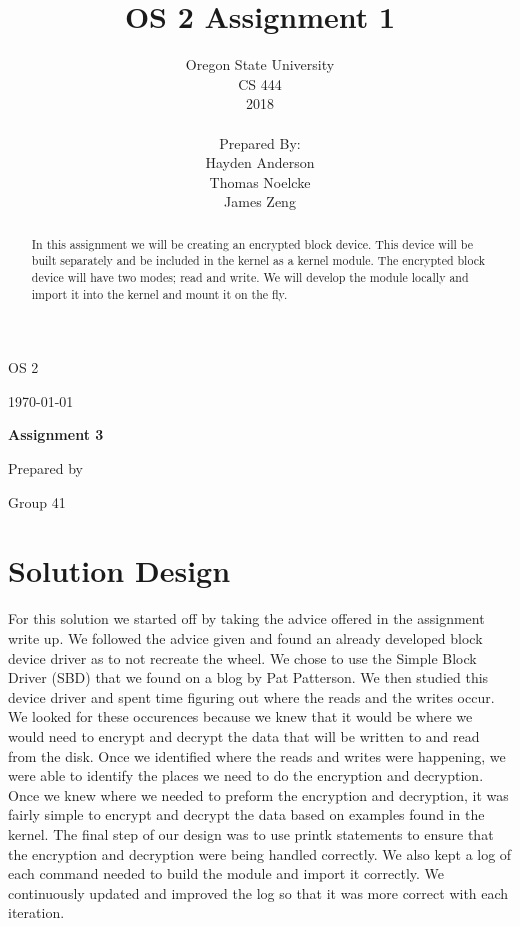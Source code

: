 \documentclass[draftclsnofoot, onecolumn, compsoc, 10pt]{IEEEtran}
\title{OS 2 Assignment 1}
\author{Oregon State University\\CS 444\\2018\\\\Prepared By:\\Hayden
Anderson\\Thomas Noelcke\\James Zeng\\}
\def \CapstoneTeamNumber{		41	}
\def \CapstoneProjectName{		Assignment 3 }
\begin{document}
\begin{titlepage}
    \begin{singlespace}
        \hfill
        \par\vspace{.2in}
        \centering
        \scshape{
            \huge OS 2 \par
            {\large\today}\par
            \vspace{1in}
            \textbf{\Huge\CapstoneProjectName}\par
            \vspace{1in}
            {\large Prepared by }\par
            Group\CapstoneTeamNumber\par
            \vspace{5pt}
            \vspace{20pt}
        }
        \vfill
    \end{singlespace}
    \begin{abstract}
        In this assignment we will be creating an encrypted block device. This device will be built separately and be included in the kernel as a kernel module. The encrypted block device will have two modes; read and write. We will develop the module locally and import it into the kernel and mount it on the fly.\\
    \end{abstract}
\end{titlepage}
\newpage
{}
\clearpage
\tableofcontents
\pagebreak

\section{Solution Design}
    For this solution we started off by taking the advice offered in the assignment write up. We followed the advice given and found an already developed block device driver as to not recreate the wheel. We chose to use the Simple Block Driver (SBD) that we found on a blog by Pat Patterson. We then studied this device driver and spent time figuring out where the reads and the writes occur. We looked for these occurences because we knew that it would be where we would need to encrypt and decrypt the data that will be written to and read from the disk. Once we identified where the reads and writes were happening, we were able to identify the places we need to do the encryption and decryption. Once we knew where we needed to preform the encryption and decryption, it was fairly simple to encrypt and decrypt the data based on examples found in the kernel. The final step of our design was to use printk statements to ensure that the encryption and decryption were being handled correctly. We also kept a log of each command needed to build the module and import it correctly. We continuously updated and improved the log so that it was more correct with each iteration.\\
\end{document}
